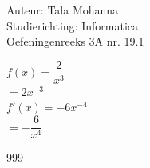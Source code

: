 \documentclass[a4paper]{article}
\begin{document}
\noindent \large Auteur: Tala Mohanna \\
\noindent \large Studierichting: Informatica\\
\noindent \large Oefeningenreeks 3A nr. 19.1\\

\medskip

\normalsize

$f(x) = \dfrac{2}{x^3}$ \\

$= 2x^{-3}$ \\
 
$f'(x) = -6x^{-4}$ \\

$= -\dfrac{6}{x^4}$

\begin{thebibliography}{999}
\end{thebibliography}
\end{document}
